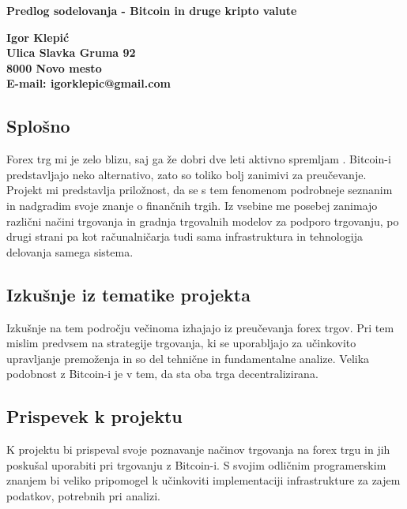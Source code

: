 \documentclass[10pt]{article}
\date{}
\begin{document}
\begin{flushleft}

{\Large
\textbf{Predlog sodelovanja - Bitcoin in druge kripto valute}
}


\vspace{5mm}

\bf Igor Klepić\\Ulica Slavka Gruma 92\\8000 Novo mesto
\\
E-mail: igorklepic@gmail.com
\end{flushleft}

\subsection*{Splošno}

Forex trg mi je zelo blizu, saj ga že dobri dve leti aktivno spremljam . Bitcoin-i predstavljajo neko alternativo, zato so toliko bolj zanimivi za preučevanje. Projekt mi predstavlja priložnost, da se s tem fenomenom podrobneje seznanim in nadgradim svoje znanje o finančnih trgih. Iz vsebine me posebej zanimajo različni načini trgovanja in gradnja trgovalnih modelov za podporo trgovanju, po drugi strani pa kot računalničarja tudi sama infrastruktura in tehnologija delovanja samega sistema.

\subsection*{Izkušnje iz tematike projekta}

Izkušnje na tem področju večinoma izhajajo iz preučevanja forex trgov. Pri tem mislim predvsem na strategije trgovanja, ki se uporabljajo za učinkovito upravljanje premoženja in so del tehnične in fundamentalne analize. Velika podobnost z Bitcoin-i je v tem, da sta oba trga decentralizirana. 

\subsection*{Prispevek k projektu}

K projektu bi prispeval svoje poznavanje načinov trgovanja na forex trgu in jih poskušal uporabiti pri trgovanju z Bitcoin-i. S svojim odličnim programerskim znanjem bi veliko pripomogel k učinkoviti implementaciji infrastrukture za zajem podatkov, potrebnih pri analizi. 
\end{document}
